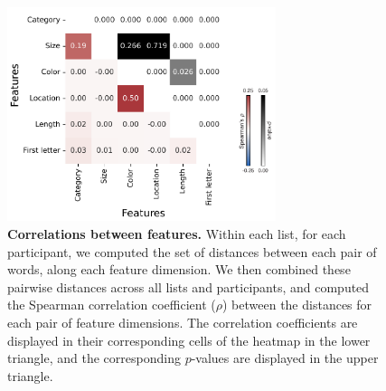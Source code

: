\documentclass{article}
\begin{document}
    \begin{figure}[tp] \centering
        \includegraphics[width=0.7\textwidth]{figures/feature_correlations}
        
        \caption{\textbf{Correlations between features.} Within each list, for
        each participant, we computed the set of distances between each pair of
        words, along each feature dimension. We then combined these pairwise
        distances across all lists and participants, and computed the Spearman
        correlation coefficient ($\rho$) between the distances for each pair of
        feature dimensions. The correlation coefficients are displayed in their
        corresponding cells of the heatmap in the lower triangle, and the
        corresponding $p$-values are displayed in the upper triangle.}
        \label{fig:feature-correlations}
        
        \end{figure}




%
%
\end{document}
